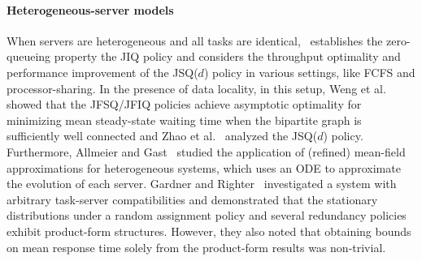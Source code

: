 \documentclass[11pt, reqno]{article}
\numberwithin{equation}{section}
\numberwithin{theorem}{section}
\begin{document}
\paragraph{Heterogeneous-server models}
When servers are heterogeneous and all tasks are identical,~\cite{Stolyar17} establishes the zero-queueing property the JIQ policy and
\cite{BM22,HLM21,MM16} considers the throughput optimality and performance improvement of the JSQ($d$) policy in various settings, like FCFS and processor-sharing. 
In the presence of data locality, in this setup, 
Weng et al.~\cite{WZS20} %
showed that the JFSQ/JFIQ policies achieve asymptotic optimality for minimizing mean steady-state waiting time when the bipartite graph is sufficiently well connected and Zhao et al.~\cite{ZhaoMW22} analyzed the JSQ($d$) policy. 
Furthermore, Allmeier and Gast~\cite{AG22} studied the application of (refined) mean-field approximations for heterogeneous systems, which uses an ODE to approximate the evolution of each server.
Gardner and Righter~\cite{GR20} investigated a system with arbitrary task-server compatibilities and demonstrated that the stationary distributions under a random assignment policy and several redundancy policies exhibit product-form structures. However, they also noted that obtaining bounds on mean response time solely from the product-form results was non-trivial.
\end{document}
